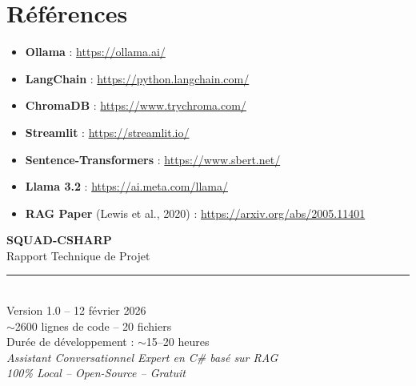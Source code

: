 \documentclass[12pt,a4paper]{report}
\begin{document}
\chapter*{Références}

\begin{itemize}
    \item \textbf{Ollama} : \url{https://ollama.ai/}
    \item \textbf{LangChain} : \url{https://python.langchain.com/}
    \item \textbf{ChromaDB} : \url{https://www.trychroma.com/}
    \item \textbf{Streamlit} : \url{https://streamlit.io/}
    \item \textbf{Sentence-Transformers} : \url{https://www.sbert.net/}
    \item \textbf{Llama 3.2} : \url{https://ai.meta.com/llama/}
    \item \textbf{RAG Paper} (Lewis et al., 2020) : \url{https://arxiv.org/abs/2005.11401}
\end{itemize}

\newpage
\thispagestyle{empty}
\vspace*{\fill}
\begin{center}
    {\Large\textcolor{primarycolor}{\textbf{SQUAD-CSHARP}}}\\[0.3cm]
    {\large Rapport Technique de Projet}\\[1cm]
    
    \rule{0.5\textwidth}{0.5pt}\\[0.5cm]
    
    {\normalsize Version 1.0 -- 12 février 2026}\\[0.3cm]
    {\normalsize $\sim$2600 lignes de code -- 20 fichiers}\\[0.3cm]
    {\normalsize Durée de développement : $\sim$15--20 heures}\\[1cm]
    
    \textit{Assistant Conversationnel Expert en C\# basé sur RAG}\\
    \textit{100\% Local -- Open-Source -- Gratuit}
\end{center}
\vspace*{\fill}
\end{document}
